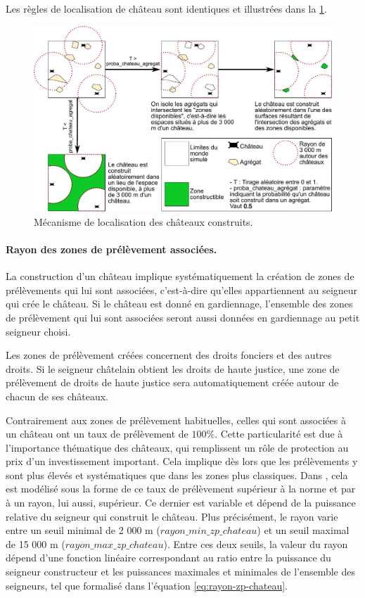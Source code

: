Les règles de localisation de château sont identiques et illustrées dans la \cref{fig:construction-chateaux}.

\begin{figure}[H]
	\centering
	\includegraphics[width=\linewidth]{img/construction_chateaux.pdf}
	\caption{Mécanisme de localisation des châteaux construits.}
	\label{fig:construction-chateaux}
\end{figure}

\paragraph{Rayon des zones de prélèvement associées.}

La construction d'un château implique systématiquement la création de zones de prélèvements qui lui sont associées, c'est-à-dire qu'elles appartiennent au seigneur qui crée le château.
Si le château est donné en gardiennage, l'ensemble des zones de prélèvement qui lui sont associées seront aussi données en gardiennage au petit seigneur choisi.

Les zones de prélèvement créées concernent des droits fonciers et des autres droits.
Si le seigneur châtelain obtient les droits de haute justice, une zone de prélèvement de droits de haute justice sera automatiquement créée autour de chacun de ses châteaux.

Contrairement aux zones de prélèvement habituelles, celles qui sont associées à un château ont un taux de prélèvement de $100\%$.
Cette particularité est due à l'importance thématique des châteaux, qui remplissent un rôle de protection au prix d'un investissement important.
Cela implique dès lors que les prélèvements y sont plus élevés et systématiques que dans les zones plus classiques.
Dans \simfeodal{}, cela est modélisé sous la forme de ce taux de prélèvement supérieur à la norme et par à un rayon, lui aussi, supérieur.
Ce dernier est variable et dépend de la puissance relative du seigneur qui construit le château.
Plus précisément, le rayon varie entre un seuil minimal de 2 000 m ($rayon\_min\_zp\_chateau$) et un seuil maximal de 15 000 m ($rayon\_max\_zp\_chateau$).
Entre ces deux seuils, la valeur du rayon dépend d'une fonction linéaire correspondant au ratio entre la puissance du seigneur constructeur et les puissances maximales et minimales de l'ensemble des seigneurs, tel que formalisé dans l'équation \ref{eq:rayon-zp-chateau}. 

